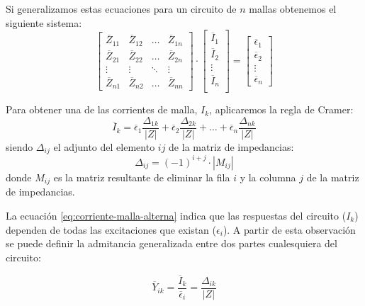 Si generalizamos estas ecuaciones para un circuito de $n$ mallas obtenemos el siguiente sistema:
\begin{equation}
  \begin{bmatrix}
    \overline{Z}_{11} & \overline{Z}_{12} & \dots & \overline{Z}_{1n} \\
    \overline{Z}_{21} & \overline{Z}_{22} & \dots & \overline{Z}_{2n} \\
    \vdots & \vdots & \ddots & \vdots \\
    \overline{Z}_{n1} & \overline{Z}_{n2} &  \dots & \overline{Z}_{nn}
  \end{bmatrix} \cdot %
  \begin{bmatrix}
    \overline{I}_1\\
    \overline{I}_2\\
    \vdots \\
    \overline{I}_n\\
  \end{bmatrix} = %
  \begin{bmatrix}
    \overline{\epsilon}_1\\
    \overline{\epsilon}_2\\
    \vdots \\
    \overline{\epsilon}_n
  \end{bmatrix}
\end{equation}

Para obtener una de las corrientes de malla, $I_k$, aplicaremos la regla de Cramer:
\begin{equation}
  \label{eq:corriente-malla-alterna}
  \overline{I}_k = \overline{\epsilon}_1 \frac{\Delta_{1k}}{|Z|} + \overline{\epsilon}_2 \frac{\Delta_{2k}}{|Z|} + \dots + \overline{\epsilon}_n \frac{\Delta_{nk}}{|Z|}
\end{equation}
siendo \(\Delta_{ij}\) el adjunto del elemento \(ij\) de la matriz de impedancias:
\[
  \Delta_{ij} = (-1)^{i+j} \cdot |M_{ij}|
\]
donde \(M_{ij}\) es la matriz resultante de eliminar la fila \(i\) y la columna \(j\) de la matriz de impedancias.

La ecuación \ref{eq:corriente-malla-alterna} indica que las respuestas del circuito (\(I_k\)) dependen de todas las excitaciones que existan (\(\epsilon_i\)). A partir de esta observación se puede definir la admitancia generalizada entre dos partes cualesquiera del circuito:

\begin{equation}
  \label{eq:admitancia-generalizada}
  \overline{Y}_{ik} = \frac{\overline{I}_k}{\overline{\epsilon}_i} = \frac{\Delta_{ik}}{|Z|}
\end{equation}

